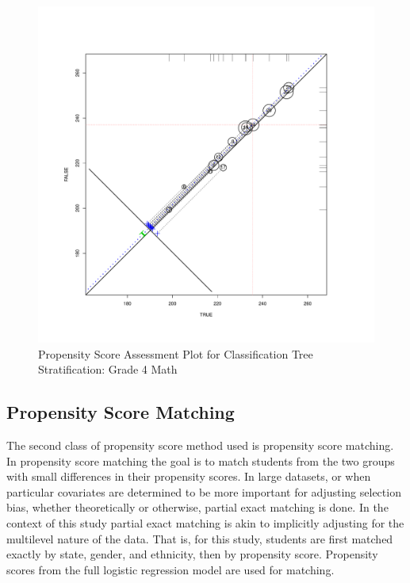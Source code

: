 \documentclass[letterpaper,12p,twoside]{article} %
\begin{document}
\begin{figure}[t]
\begin{center}
\includegraphics[width=\textwidth]{../Figures2009/g4math-circpsa-tree.pdf}
\caption{Propensity Score Assessment Plot for Classification Tree Stratification: Grade 4 Math}
\label{fig:g4math:circpsa:tree}
\end{center}
\end{figure}

\clearpage





\subsection{Propensity Score Matching}

The second class of propensity score method used is propensity score matching. In propensity score matching the goal is to match students from the two groups with small differences in their propensity scores. In large datasets, or when particular covariates are determined to be more important for adjusting selection bias, whether theoretically or otherwise, partial exact matching is done. In the context of this study partial exact matching is akin to implicitly adjusting for the multilevel nature of the data. That is, for this study, students are first matched exactly by state, gender, and ethnicity, then by propensity score. Propensity scores from the full logistic regression model are used for matching.
\end{document}
